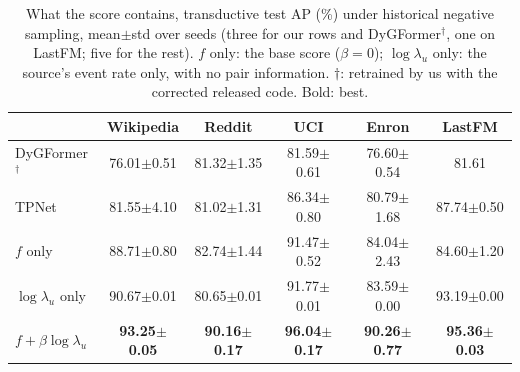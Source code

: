 \begin{table}[t]
\caption{What the score contains, transductive test AP (\%) under historical negative sampling, mean{\tiny$\pm$std} over seeds (three for our rows and DyGFormer$^\dagger$, one on LastFM; five for the rest). $f$ only: the base score ($\beta=0$); $\log\lambda_u$ only: the source's event rate only, with no pair information. $\dagger$: retrained by us with the corrected released code. Bold: best.}
\label{tab:i1_decomposition}
\centering
\scriptsize
\setlength{\tabcolsep}{2pt}
\renewcommand{\arraystretch}{0.9}
\begin{tabular}{lccccc}
\toprule
 & Wikipedia & Reddit & UCI & Enron & LastFM \\
\midrule
DyGFormer$^\dagger$ & 76.01{\tiny$\pm$0.51} & 81.32{\tiny$\pm$1.35} & 81.59{\tiny$\pm$0.61} & 76.60{\tiny$\pm$0.54} & 81.61 \\
TPNet & 81.55{\tiny$\pm$4.10} & 81.02{\tiny$\pm$1.31} & 86.34{\tiny$\pm$0.80} & 80.79{\tiny$\pm$1.68} & 87.74{\tiny$\pm$0.50} \\
\midrule
$f$ only & 88.71{\tiny$\pm$0.80} & 82.74{\tiny$\pm$1.44} & 91.47{\tiny$\pm$0.52} & 84.04{\tiny$\pm$2.43} & 84.60{\tiny$\pm$1.20} \\
$\log\lambda_u$ only & 90.67{\tiny$\pm$0.01} & 80.65{\tiny$\pm$0.01} & 91.77{\tiny$\pm$0.01} & 83.59{\tiny$\pm$0.00} & 93.19{\tiny$\pm$0.00} \\
$f+\beta\log\lambda_u$ & \textbf{93.25{\tiny$\pm$0.05}} & \textbf{90.16{\tiny$\pm$0.17}} & \textbf{96.04{\tiny$\pm$0.17}} & \textbf{90.26{\tiny$\pm$0.77}} & \textbf{95.36{\tiny$\pm$0.03}} \\
\bottomrule
\end{tabular}
\end{table}
